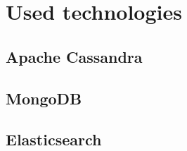 \chapter{Used technologies}

\section{Apache Cassandra}

\section{MongoDB}

\section{Elasticsearch}

